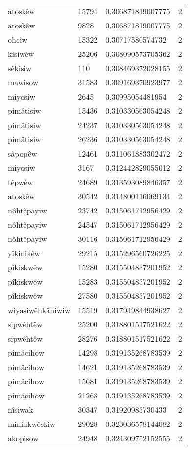 \begin{longtable}{llll}
atoskêw & 15794 & 0.306871819007775 & 2 \\
atoskêw & 9828 & 0.306871819007775 & 2 \\
ohcîw & 15322 & 0.30717580574732 & 2 \\
kisîwêw & 25206 & 0.308090573705362 & 2 \\
sêkisiw & 110 & 0.308469372028155 & 2 \\
mawisow & 31583 & 0.309169370923977 & 2 \\
miyosiw & 2645 & 0.30995054481954 & 2 \\
pimâtisiw & 15436 & 0.310330563054248 & 2 \\
pimâtisiw & 24237 & 0.310330563054248 & 2 \\
pimâtisiw & 26236 & 0.310330563054248 & 2 \\
sâpopêw & 12461 & 0.311061883302472 & 2 \\
miyosiw & 3167 & 0.312442829055012 & 2 \\
têpwêw & 24689 & 0.313593089846357 & 2 \\
atoskêw & 30542 & 0.314800116069134 & 2 \\
nôhtêpayiw & 23742 & 0.315061712956429 & 2 \\
nôhtêpayiw & 24547 & 0.315061712956429 & 2 \\
nôhtêpayiw & 30116 & 0.315061712956429 & 2 \\
yîkinikêw & 29215 & 0.315296560726225 & 2 \\
pîkiskwêw & 15280 & 0.315504837201952 & 2 \\
pîkiskwêw & 15283 & 0.315504837201952 & 2 \\
pîkiskwêw & 27580 & 0.315504837201952 & 2 \\
wiyasiwêhkâniwiw & 15519 & 0.317949844938627 & 2 \\
sipwêhtêw & 25200 & 0.318801517521622 & 2 \\
sipwêhtêw & 28276 & 0.318801517521622 & 2 \\
pimâcihow & 14298 & 0.319135268783539 & 2 \\
pimâcihow & 14621 & 0.319135268783539 & 2 \\
pimâcihow & 15681 & 0.319135268783539 & 2 \\
pimâcihow & 21268 & 0.319135268783539 & 2 \\
nîsiwak & 30347 & 0.31920983730433 & 2 \\
minihkwêskiw & 29028 & 0.323036578144082 & 2 \\
akopisow & 24948 & 0.324309752152555 & 2 \\

\end{longtable}
